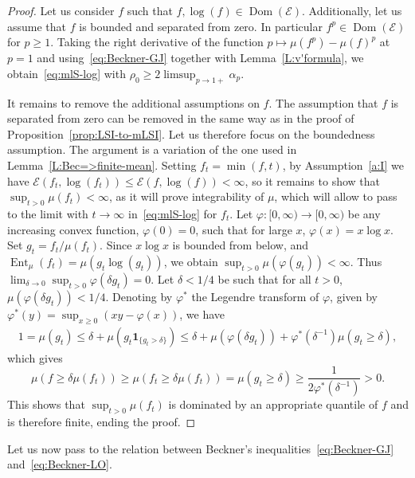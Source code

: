 \documentclass[a4paper]{amsart}
\theoremstyle{definition}
\theoremstyle{remark}
\numberwithin{equation}{section}
\DeclareMathOperator{\Dom}{Dom} %
\newcommand*{\calE}{\mathcal{E}}
\DeclareMathOperator{\Ent}{Ent}	%
\newcommand*{\ind}[1]{\mathbf{1}_{#1}}
\begin{document}
\begin{proof}
Let us consider $f$ such that $f,\log(f) \in \Dom(\calE)$. Additionally, let us assume that $f$ is bounded and separated from zero. In particular $f^p \in \Dom(\calE)$ for $p \ge 1$. Taking the right derivative of the function $p\mapsto \mu(f^p) - \mu(f)^p$ at $p=1$ and using~\eqref{eq:Beckner-GJ} together with Lemma~\ref{L:v'formula}, we obtain~\eqref{eq:mlS-log} with $\rho_0 \ge 2\limsup_{p\to 1+} \alpha_p$.

It remains to remove the additional assumptions on $f$. The assumption that $f$ is separated from zero can be removed in the same way as in the proof of Proposition~\ref{prop:LSI-to-mLSI}. Let us therefore focus on the boundedness assumption. The argument is a variation of the one used in Lemma~\ref{L:Bec=>finite-mean}. Setting $f_t = \min(f,t)$, by Assumption~\ref{a:I} we have $\calE(f_t,
\log(f_t)) \le \calE(f,\log(f)) < \infty$, so it remains to show that $\sup_{t>0} \mu(f_t) < \infty$, as it will prove integrability of $\mu$, which will allow to pass to the limit with $t \to \infty$ in~\eqref{eq:mlS-log} for $f_t$. Let $\varphi\colon [0,\infty)\to [0,\infty)$ be any increasing convex function, $\varphi(0) = 0$, such that for large $x$, $\varphi(x) = x\log x$. Set $g_t = f_t/\mu(f_t)$. Since $x\log x$ is bounded from below, and $\Ent_\mu(f_t) = \mu(g_t \log(g_t))$, we obtain $\sup_{t > 0} \mu(\varphi(g_t)) < \infty$. Thus $\lim_{\delta \to 0}\sup_{t>0} \varphi(\delta g_t) = 0$. Let $\delta < 1/4$ be such that for all $t > 0$, $\mu(\varphi(\delta g_t)) < 1/4$. Denoting by $\varphi^\ast$ the Legendre transform of $\varphi$, given by $\varphi^\ast(y) = \sup_{x \ge 0} (xy - \varphi(x))$, we have
\begin{align*}
1 = \mu(g_t) \le \delta + \mu(g_t\ind{\{g_t > \delta\}}) \le \delta + \mu(\varphi(\delta g_t)) + \varphi^\ast(\delta^{-1})\mu(g_t \ge \delta),
\end{align*}
which gives
\begin{displaymath}
  \mu(f \ge \delta\mu(f_t)) \ge \mu(f_t \ge \delta\mu(f_t)) = \mu(g_t \ge \delta) \ge \frac{1}{2\varphi^\ast(\delta^{-1})} > 0.
\end{displaymath}
This shows that $\sup_{t> 0} \mu(f_t)$ is dominated by an appropriate quantile of $f$ and is therefore finite, ending the proof.
\end{proof}





Let us now pass to the relation between Beckner's inequalities~\eqref{eq:Beckner-GJ} and~\eqref{eq:Beckner-LO}.
\end{document}
